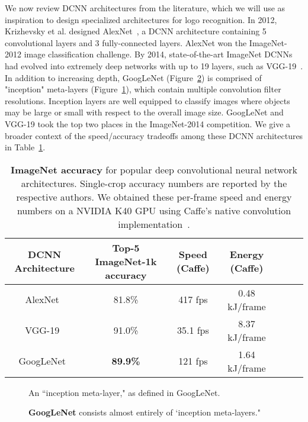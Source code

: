 \documentclass{bmvc2k}
\begin{document}
We now review DCNN architectures from the literature, which we will use as inspiration to design specialized architectures for logo recognition.
In 2012, Krizhevsky et al. designed AlexNet~\cite{alexnet}, a DCNN architecture containing 5 convolutional layers and 3 fully-connected layers. AlexNet won the ImageNet-2012 image classification challenge.
By 2014, state-of-the-art ImageNet DCNNs had evolved into extremely deep networks with up to 19 layers, such as VGG-19~\cite{VGG-19}.
In addition to increasing depth, GoogLeNet (Figure~\ref{fig:googlenet}) is comprised of "inception" meta-layers (Figure~\ref{fig:inception_layer}), which contain multiple convolution filter resolutions. 
Inception layers are well equipped to classify images where objects may be large or small with respect to the overall image size.
GoogLeNet and VGG-19 took the top two places in the ImageNet-2014 competition.
We give a broader context of the speed/accuracy tradeoffs among these DCNN architectures in Table~\ref{T:imagenet-accuracy}.

\begin{table}[htb]
\scriptsize
\caption{{\bf ImageNet accuracy} for popular deep convolutional neural network architectures. Single-crop accuracy numbers are reported by the respective authors. We obtained these per-frame speed and energy numbers on a NVIDIA K40 GPU using Caffe's native convolution implementation~\cite{jia2014caffe}.}
\label{T:imagenet-accuracy}
\centering
\begin{tabular}{|c|c|c|c|c|c|c|}
\hline
DCNN Architecture &  Top-5 ImageNet-1k accuracy &  Speed (Caffe) & Energy (Caffe) \\ \hline
AlexNet~\cite{alexnet} & 81.8\% & 417 fps & 0.48 kJ/frame \\ \hline
VGG-19~\cite{VGG-19}  & 91.0\% & 35.1 fps & 8.37 kJ/frame \\ \hline   GoogLeNet~\cite{googlenet} & \bf 89.9\% & 121 fps & 1.64 kJ/frame \\ \hline 
\end{tabular}
\end{table}

\begin{figure}[htb]
\centering
    \caption{An ``inception meta-layer," as defined in GoogLeNet.}
    \label{fig:inception_layer}
\end{figure}

\begin{figure}[htb]
\centering
    \caption{{\bf GoogLeNet} consists almost entirely of `inception meta-layers."}
    \label{fig:googlenet}
\end{figure}
\end{document}
